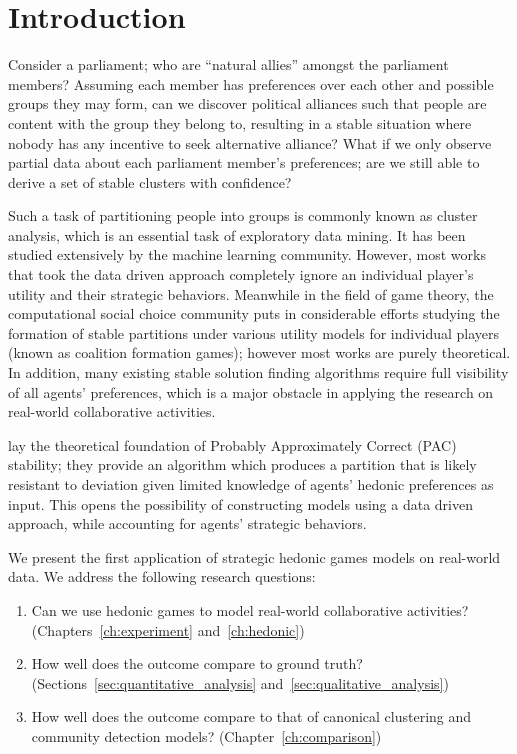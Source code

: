 
\chapter{Introduction}
\label{ch:intro}

Consider a parliament; who are ``natural allies'' amongst the parliament members?
Assuming each member has preferences over each other and possible groups they may
form, can we discover political alliances such that people are content with the 
group they belong to, resulting in a stable situation where nobody has any
incentive to seek alternative alliance?
What if we only observe partial data about each parliament member's preferences;
are we still able to derive a set of stable clusters with confidence? 

Such a task of partitioning people into groups is commonly known as cluster
analysis, which is an essential task of exploratory data mining.
It has been studied extensively by the machine learning community.
However, most works that took the data driven approach completely ignore an
individual player's utility and their strategic behaviors.
Meanwhile in the field of game theory, the computational social choice
community puts in considerable efforts studying the formation of stable
partitions under various utility models for individual players (known as
coalition formation games); however most works are purely theoretical.
In addition, many existing stable solution finding algorithms require full
visibility of all agents' preferences, which is a major obstacle in applying
the research on real-world collaborative activities.

 lay the theoretical foundation of Probably
Approximately Correct (PAC) stability; they provide an algorithm which
produces a partition that is likely resistant to deviation given limited
knowledge of agents' hedonic preferences as input.  
This opens the possibility of constructing models using a data driven
approach, while accounting for agents' strategic behaviors.

We present the first application of strategic hedonic games models on
real-world data.
We address the following research questions:
\begin{enumerate}
    \item Can we use hedonic games to model real-world collaborative
      activities? (Chapters~\ref{ch:experiment} and~\ref{ch:hedonic})
    \item How well does the outcome compare to ground truth?
      (Sections~\ref{sec:quantitative_analysis}
      and~\ref{sec:qualitative_analysis})
    \item How well does the outcome compare to that of canonical clustering
      and community detection models? (Chapter~\ref{ch:comparison})
\end{enumerate}

